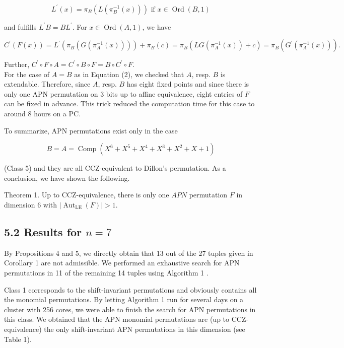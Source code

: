 \documentclass[10pt]{article}
\begin{document}
$$
L^{\prime}(x)=\pi_{B}\left(L\left(\pi_{B}^{-1}(x)\right)\right) \text { if } x \in \operatorname{Ord}(B, 1)
$$

and fulfills $L^{\prime} B=B L^{\prime}$. For $x \in \operatorname{Ord}(A, 1)$, we have

$$
C^{\prime}(F(x))=L^{\prime}\left(\pi_{B}\left(G\left(\pi_{A}^{-1}(x)\right)\right)\right)+\pi_{B}(c)=\pi_{B}\left(L G\left(\pi_{A}^{-1}(x)\right)+c\right)=\pi_{B}\left(G^{\prime}\left(\pi_{A}^{-1}(x)\right)\right) .
$$

Further, $C^{\prime} \circ F \circ A=C^{\prime} \circ B \circ F=B \circ C^{\prime} \circ F$.\\
For the case of $A=B$ as in Equation (2), we checked that $A$, resp. $B$ is extendable. Therefore, since $A$, resp. $B$ has eight fixed points and since there is only one APN permutation on 3 bits up to affine equivalence, eight entries of $F$ can be fixed in advance. This trick reduced the computation time for this case to around 8 hours on a PC.

To summarize, APN permutations exist only in the case


\begin{equation*}
B=A=\operatorname{Comp}\left(X^{6}+X^{5}+X^{4}+X^{3}+X^{2}+X+1\right) \tag{3}
\end{equation*}


(Class 5) and they are all CCZ-equivalent to Dillon's permutation. As a conclusion, we have shown the following.

Theorem 1. Up to CCZ-equivalence, there is only one $A P N$ permutation $F$ in dimension 6 with $\left|\operatorname{Aut}_{\mathrm{LE}}(F)\right|>1$.

\subsection*{5.2 Results for $n=7$}
By Propositions 4 and 5, we directly obtain that 13 out of the 27 tuples given in Corollary 1 are not admissible. We performed an exhaustive search for APN permutations in 11 of the remaining 14 tuples using Algorithm 1 .

Class 1 corresponds to the shift-invariant permutations and obviously contains all the monomial permutations. By letting Algorithm 1 run for several days on a cluster with 256 cores, we were able to finish the search for APN permutations in this class. We obtained that the APN monomial permutations are (up to CCZ-equivalence) the only shift-invariant APN permutations in this dimension (see Table 1).
\end{document}
